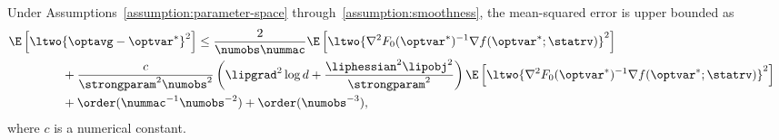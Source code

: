 \documentclass[11pt,twoside]{article}
\theoremstyle{definition}
\newcommand{\red}[1]{\textcolor{red}{#1}}
\def\jcdcomment#1{\vspace{.2cm}{\large{\bf JCD Comment:}
    \red{#1}}\vspace{.2cm}}
\begin{document}
\begin{theorem}
  \label{theorem:no-bootstrap}
  Under Assumptions~\ref{assumption:parameter-space}
  through~\ref{assumption:smoothness}, the mean-squared error is upper
  bounded as
  \begin{align}
    \lefteqn{\E\left[\ltwo{\optavg - \optvar^*}^2\right] \le
      \frac{2}{\numobs \nummac} \E\left[\ltwo{\nabla^2
          F_0(\optvar^*)^{-1} \nabla f(\optvar^*; \statrv)}^2\right] }
    \label{eqn:no-bootstrap} \\
    & \qquad\qquad ~ + \frac{c}{\strongparam^2 \numobs^2}
    \left(\lipgrad^2 \log d + \frac{\liphessian^2 \lipobj^2}{\strongparam^2} \right)
    \E\left[\ltwo{\nabla^2 F_0(\optvar^*)^{-1} \nabla f(\optvar^*;
        \statrv)}^2\right] \nonumber \\ & \qquad\qquad ~ +
    \order(\nummac^{-1} \numobs^{-2}) + \order(\numobs^{-3}),
    \nonumber
  \end{align}
  where $c$ is a numerical constant.
\end{theorem}

\end{document}
